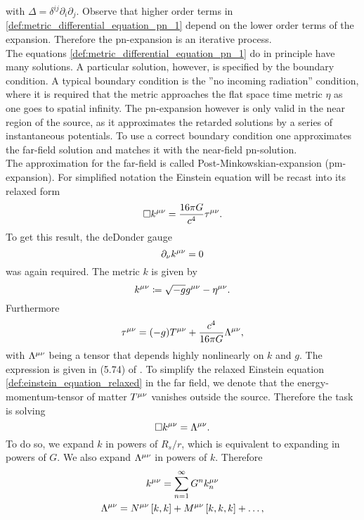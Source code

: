 with $\Delta = \delta^{ij}\partial_i\partial_j$. Observe that higher order terms in \eqref{def:metric_differential_equation_pn_1} depend on the lower order terms of the expansion. Therefore the \gls{pn}-expansion is an iterative process.\\
The equations \eqref{def:metric_differential_equation_pn_1} do in principle have many solutions. A particular solution, however, is specified by the boundary condition. A typical boundary condition is the ''no incoming radiation'' condition, where it is required that the metric approaches the flat space time metric $\eta$ as one goes to spatial infinity. The \gls{pn}-expansion however is only valid in the near region of the source, as it approximates the retarded solutions by a series of instantaneous potentials. To use a correct boundary condition one approximates the far-field solution and matches it with the near-field \gls{pn}-solution.\\
The approximation for the far-field is called Post-Minkowskian-expansion (\gls{pm}-expansion). For simplified notation the Einstein equation will be recast into its relaxed form
\begin{equation}\label{def:einstein_equation_relaxed}
\Box k^{\mu\nu} = \frac{16\pi G}{c^4}\tau^{\mu\nu}.
\end{equation}
To get this result, the deDonder gauge
\begin{equation}
\partial_\nu k^{{\mu\nu}}=0
\end{equation}
was again required. The metric $k$ is given by
\begin{equation}
k^{\mu\nu}\coloneqq \sqrt{-g}g^{\mu\nu} -\eta^{\mu\nu}.
\end{equation}
Furthermore
\begin{equation}\label{def:pn_tau}
\tau^{\mu\nu} = {\left( -g \right)}T^{\mu\nu} + \frac{c^4}{16\pi G}\Lambda^{\mu\nu},
\end{equation}
with $\Lambda^{\mu\nu}$ being a tensor that depends highly nonlinearly on $k$ and $g$. The expression is given in (5.74) of \cite{gwv1}. To simplify the relaxed Einstein equation \eqref{def:einstein_equation_relaxed} in the far field, we denote that the energy-momentum-tensor of matter $T^{\mu\nu}$ vanishes outside the source. Therefore the task is solving
\begin{equation}
\Box k^{\mu\nu} = \Lambda^{\mu\nu}.
\end{equation}
To do so, we expand $k$ in powers of $R_s/r$, which is equivalent to expanding in powers of $G$. We also expand $\Lambda^{\mu\nu}$ in powers of $k$. Therefore
\begin{gather}
k^{\mu\nu}=\sum_{n=1}^\infty G^n k^{\mu\nu}_n\\
\Lambda^{\mu\nu} = N^{\mu\nu}\left[k,k\right] + M^{\mu\nu}\left[k,k,k\right]+\dotsc,
\end{gather}
